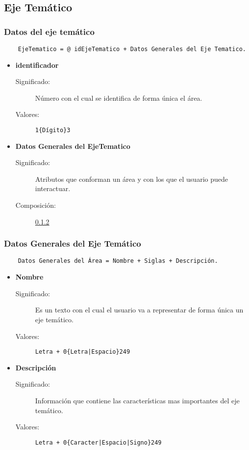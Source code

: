 \subsection{Eje Temático}
\label{dd:EjeTematico}
\subsubsection{Datos del eje temático}
\begin{lstlisting}
	EjeTematico = @ idEjeTematico + Datos Generales del Eje Tematico.
\end{lstlisting}
\begin{itemize}
	\item	\textbf{identificador}
		\begin{description}
			\item [Significado:] Número con el cual se identifica de forma única el área.
			\item [Valores:]{\begin{lstlisting}
1{Dígito}3\end{lstlisting}}
		\end{description}
	\item \textbf{Datos Generales del EjeTematico}
		\begin{description}
			\item [Significado:] Atributos que conforman un área y con los que el usuario puede interactuar.
			\item [Composición:] \ref{DatosGenerales_PS}
		\end{description}
\end{itemize}

\subsubsection{Datos Generales del Eje Temático}
\label{DatosGenerales_PS}
\begin{lstlisting}
	Datos Generales del Área = Nombre + Siglas + Descripción.
\end{lstlisting}
\begin{itemize}
	\item	\textbf{Nombre}
		\begin{description}
			\item [Significado:] Es un texto con el cual el usuario va a representar de forma única un eje temático.
			\item [Valores:]{\begin{lstlisting}
Letra + 0{Letra|Espacio}249\end{lstlisting}}
		\end{description}
	\item	\textbf{Descripción}
		\begin{description}
			\item [Significado:] Información que contiene las características mas importantes del eje temático.
			\item [Valores:]{\begin{lstlisting}
Letra + 0{Caracter|Espacio|Signo}249\end{lstlisting}}
		\end{description}
\end{itemize}

